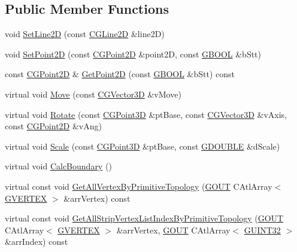 \subsection*{Public Member Functions}
\begin{DoxyCompactItemize}
\item 
void \hyperlink{class_c_g_object_line2_d_a89b0da462912b9e8a5bb40eebdf1d958}{Set\+Line2\+D} (const \hyperlink{class_c_g_line2_d}{C\+G\+Line2\+D} \&line2\+D)
\item 
void \hyperlink{class_c_g_object_line2_d_ae48e6d989d8fbff4715598a7c00db1cd}{Set\+Point2\+D} (const \hyperlink{class_c_g_point2_d}{C\+G\+Point2\+D} \&point2\+D, const \hyperlink{_g_types_8h_a2901915743626352a6820c5405f556dc}{G\+B\+O\+O\+L} \&b\+Stt)
\item 
const \hyperlink{class_c_g_point2_d}{C\+G\+Point2\+D} \& \hyperlink{class_c_g_object_line2_d_aec38882234ae9f6fee6f6311dd0c1bdf}{Get\+Point2\+D} (const \hyperlink{_g_types_8h_a2901915743626352a6820c5405f556dc}{G\+B\+O\+O\+L} \&b\+Stt) const 
\item 
virtual void \hyperlink{class_c_g_object_line2_d_a0a092377f92fbcc43118b1e59b48d725}{Move} (const \hyperlink{_g_point3_d_8h_aa7e73d39f4c991acb5a13c84b498366d}{C\+G\+Vector3\+D} \&v\+Move)
\item 
virtual void \hyperlink{class_c_g_object_line2_d_a449d2a358d8a8317cb523d9b532c8909}{Rotate} (const \hyperlink{class_c_g_point3_d}{C\+G\+Point3\+D} \&pt\+Base, const \hyperlink{_g_point3_d_8h_aa7e73d39f4c991acb5a13c84b498366d}{C\+G\+Vector3\+D} \&v\+Axis, const \hyperlink{class_c_g_point2_d}{C\+G\+Point2\+D} \&v\+Ang)
\item 
virtual void \hyperlink{class_c_g_object_line2_d_ac8f76bd20743a9c7da450ee40e364b1d}{Scale} (const \hyperlink{class_c_g_point3_d}{C\+G\+Point3\+D} \&pt\+Base, const \hyperlink{_g_types_8h_afd05ac85f90ee8e2a733928545462cd4}{G\+D\+O\+U\+B\+L\+E} \&d\+Scale)
\item 
virtual void \hyperlink{class_c_g_object_line2_d_aaec5b241c1c1ac160bce0f42863cc2b1}{Calc\+Boundary} ()
\item 
virtual const void \hyperlink{class_c_g_object_line2_d_a92c8c00179a68c7cebd0ff9210ffd18e}{Get\+All\+Vertex\+By\+Primitive\+Topology} (\hyperlink{_g_types_8h_a0858ec221262e635612871d70ca233ad}{G\+O\+U\+T} C\+Atl\+Array$<$ \hyperlink{struct_g_v_e_r_t_e_x}{G\+V\+E\+R\+T\+E\+X} $>$ \&arr\+Vertex) const 
\item 
virtual const void \hyperlink{class_c_g_object_line2_d_a666556a7f4ec3b2d2497e55aa6aaecee}{Get\+All\+Strip\+Vertex\+List\+Index\+By\+Primitive\+Topology} (\hyperlink{_g_types_8h_a0858ec221262e635612871d70ca233ad}{G\+O\+U\+T} C\+Atl\+Array$<$ \hyperlink{struct_g_v_e_r_t_e_x}{G\+V\+E\+R\+T\+E\+X} $>$ \&arr\+Vertex, \hyperlink{_g_types_8h_a0858ec221262e635612871d70ca233ad}{G\+O\+U\+T} C\+Atl\+Array$<$ \hyperlink{_g_types_8h_a2e1a1c77d1349057202e2f34e071019c}{G\+U\+I\+N\+T32} $>$ \&arr\+Index) const 

\end{DoxyCompactItemize}
